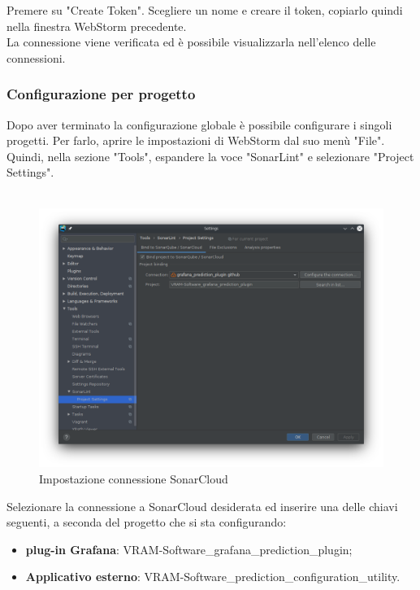 Premere su "Create Token". Scegliere un nome e creare il token, copiarlo quindi nella finestra WebStorm precedente. \\
La connessione viene verificata ed è possibile visualizzarla nell'elenco delle connessioni.
\subsubsection{Configurazione per progetto}
Dopo aver terminato la configurazione globale è possibile configurare i singoli progetti. Per farlo, aprire le impostazioni di WebStorm dal suo menù "File". Quindi, nella sezione "Tools", espandere la voce "SonarLint" e selezionare "Project Settings".
\\
\\
\begin{figure}[H] 	
	\begin{center}
		\includegraphics[width=\textwidth,height=\textheight,keepaspectratio]{img/sonarlint-project.png}
	\end{center}
	\caption{Impostazione connessione SonarCloud}
\end{figure}

Selezionare la connessione a SonarCloud desiderata ed inserire una delle chiavi seguenti, a seconda del progetto che si sta configurando:
\begin{itemize}
	\item \textbf{plug-in Grafana}: VRAM-Software\_grafana\_prediction\_plugin;
	\item \textbf{Applicativo esterno}: VRAM-Software\_prediction\_configuration\_utility.
\end{itemize}

